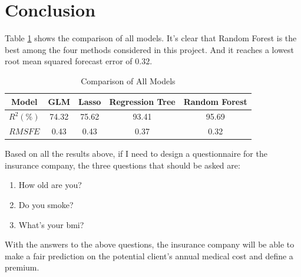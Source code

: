 \documentclass{article}
\begin{document}
\section{Conclusion}

Table \ref{tab:comp_mdl} shows the comparison of all models. It's clear that Random Forest is the best among the four methods considered in this project. And it reaches a lowest root mean squared forecast error of $0.32$.
\begin{table}[!ht]
	\centering
	\begin{tabular}{|c|c|c|c|c|}
		\hline
		Model & GLM & Lasso & Regression Tree & Random Forest \\
		\hline
		$R^2\left(\%\right)$ & 74.32 & 75.62 & 93.41 & 95.69 \\
		\hline
		$RMSFE$ & 0.43 & 0.43 & 0.37 & 0.32 \\
		\hline
	\end{tabular}
	\caption{Comparison of All Models}
	\label{tab:comp_mdl}
\end{table}

Based on all the results above, if I need to design a questionnaire for the insurance company, the three questions that should be asked are:
\begin{enumerate}
	\item How old are you?
	\item Do you smoke?
	\item What's your bmi?
\end{enumerate}
With the answers to the above questions, the insurance company will be able to make a fair prediction on the potential client's annual medical cost and define a premium.
\end{document}
